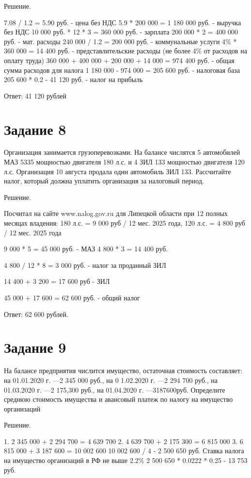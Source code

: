 \documentclass[14pt,a4paper]{extarticle}
\begin{document}
Решение.

7.08 / 1.2 = 5.90 руб. - цена без НДС
5.9 * 200 000 = 1 180 000 руб. - выручка без НДС
10 000 руб. * 12 * 3 = 360 000 руб. - зарплата
200 000 * 2 = 400 000 руб. - мат. расходы
240 000 / 1.2 = 200 000 руб. - коммунальные услуги
4\% * 360 000 = 14 400 руб. - представлительские расходы (не более 4\% от
расходов на оплату труда)
360 000 + 400 000 + 200 000 + 14 000 = 974 400 руб. - общая сумма расходов для налога
1 180 000 - 974 000 = 205 600 руб. - налоговая база
205 600 * 0.2 - 41 120 руб. - налог на прибыль

Ответ: 41 120 рублей

\section{Задание 8}
Организация занимается грузоперевозками. На балансе числятся 5
автомобилей МАЗ 5335 мощностью двигателя 180 л.с. и 4 ЗИЛ 133 мощностью двигателя
120 л.с. Организация 10 августа продала один автомобиль ЗИЛ 133.
Рассчитайте налог, который должна уплатить организация за налоговый период.

Решение.

Посчитал на сайте www.nalog.gov.ru для Липецкой области при 12 полных месяцах владения:
180 л.с. = 9 000 руб / 12 мес. 2025 года,
120 л.с. = 4 800 руб / 12 мес. 2025 года

9 000 * 5 = 45 000 руб. - МАЗ
4 800 * 3 = 14 400 руб.

4 800 / 12 * 8 = 3 000 руб. - налог за проданный ЗИЛ

14 400 + 3 200 = 17 600 руб - ЗИЛ

45 000 + 17 600 = 62 600 руб. - общий налог

Ответ: 62 600 рублей.

\section{Задание 9}
На балансе предприятия числится имущество, остаточная стоимость
составляет:
на 01.01.2020 г. —2 345 000 руб.,
на 0 1.02.2020 г. —2 294 700 руб.,
на 01.03.2020 г. —2 175,300 руб.,
на 01.04.2020 г. —3187600руб.
Определите среднюю стоимость имущества и авансовый платеж по налогу на
имущество организаций

Решение.

1. 2 345 000 + 2 294 700 = 4 639 700
2. 4 639 700 + 2 175 300 = 6 815 000
3. 6 815 000 + 3 187 600 = 10 002 600
10 002 600 / 4 - 2 500 650 руб.
Ставка налога на имущество организаций в РФ не выше 2.2\%
2 500 650 * 0.0222 * 0.25 - 13 753 руб.
\end{document}
